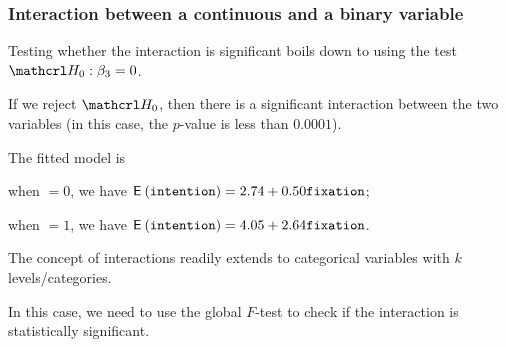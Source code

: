 \documentclass{beamer}
\begin{document}
\begin{frame}
\frametitle{Interaction between a continuous and a binary variable}
\bi
\item Testing whether the interaction is significant boils down to using the test $\Hy_0: \beta_3=0$.
\item If we reject $\Hy_0$, then there is a significant interaction between the two variables (in this case, the $p$-value is less than $0.0001$). 
\item The fitted model is
\bi
\item when $=0$, we have ${\mathsf E}_{}\left(\texttt{intention}\right)=2.74+0.50  \texttt{fixation}$;
\item when $=1$, we have ${\mathsf E}_{}\left(\texttt{intention}\right)=4.05+2.64  \texttt{fixation}$.
\ei
\item The concept of interactions readily extends to categorical variables with $k$ levels/categories.
\bi    
\item In this case, we need to use the global $F$-test to check if the interaction is statistically significant.
\ei
 \ei
\end{frame}
\end{document}
